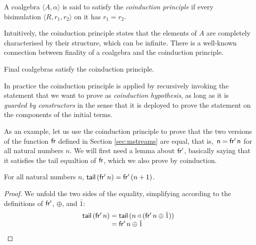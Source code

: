 \begin{definition}\label{def:coinduction}
A coalgebra $\langle A,\alpha\rangle$ is said to satisfy the {\em coinduction principle} if every bisimulation $\langle R,r_1,r_2\rangle$ on it has $r_1=r_2$.
\end{definition}

Intuitively, the coinduction principle states that the elements of $A$ are completely characterised by their structure, which can be infinite.
There is a well-known connection between finality of a coalgebra and the coinduction principle.

\begin{theorem}\label{th:coinduction}
Final coalgebras satisfy the coinduction principle.
\end{theorem}

In practice the coinduction principle is applied by recursively invoking the statement that we want to prove as {\em coinduction hypothesis}, as long as it is {\em guarded by constructors} in the sense that it is deployed to prove the statement on the components of the initial terms.

As an example, let us use the coinduction principle to prove that the two versions of the function $\mathsf{fr}$ defined in Section \ref{sec:mstreams} are equal,
that is, $\sf\,n = \mathsf{fr'}\,n$ for all natural numbers $n$.
We will first need a lemma about $\mathsf{fr'}$, basically saying that it satisfies the tail equaltion of $\mathsf{fr}$, which we also prove by coinduction.
\begin{lemma}
For all natural numbers $n$, $\mathsf{tail}\,(\mathsf{fr'}\,n) = \mathsf{fr'}\,(n+1)$.
\end{lemma}
\begin{proof}
We unfold the two sides of the equality, simplifying according to the definitions of $\mathsf{fr'}$, $\oplus$, and $\bar{1}$:
$$
\begin{array}{r@{{}={}}l}
\tail\,(\sfp\,n)
& \tail\,(n \scons (\sfp\,n \oplus \bar{1}))\\
& \sfp\,n \oplus \bar{1}
\end{array}
$$
\end{proof}
